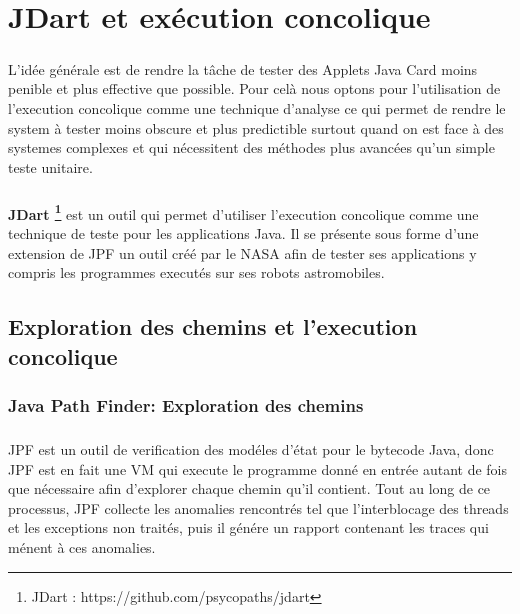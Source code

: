 \chapter{JDart et exécution concolique}
	\paragraph{}
		L'idée générale est de rendre la tâche de tester des Applets Java Card moins penible et plus effective que possible.
		Pour celà nous optons pour l'utilisation de l'execution concolique comme une technique d'analyse ce qui permet de rendre 
		le system à tester moins obscure et plus predictible surtout quand on est face à des systemes complexes
		et qui nécessitent des méthodes plus avancées qu'un simple teste unitaire.
    
	\paragraph{}
		\textbf{JDart \footnote{JDart : https://github.com/psycopaths/jdart}} est un outil qui permet d'utiliser l'execution concolique
		comme une technique de teste pour les applications Java.
		\newline
		Il se présente sous forme d'une extension de \gls{JPF} un outil créé par le NASA afin de tester ses applications y compris les programmes executés sur ses robots astromobiles.
	\section{Exploration des chemins et l'execution concolique}
		\subsection{Java Path Finder: Exploration des chemins}
			\nocite{JPF}
			
			\paragraph{}
				\gls{JPF} est un outil de verification des modéles d'état pour le bytecode Java,
				donc \gls{JPF} est en fait une \gls{VM} qui execute le programme donné en entrée autant de fois que nécessaire
				afin d'explorer chaque chemin qu'il contient.
				Tout au long de ce processus, \gls{JPF} collecte les anomalies rencontrés tel que l'interblocage des threads et les exceptions non traités,
				puis il génére un rapport contenant les traces qui ménent à ces anomalies.
	
